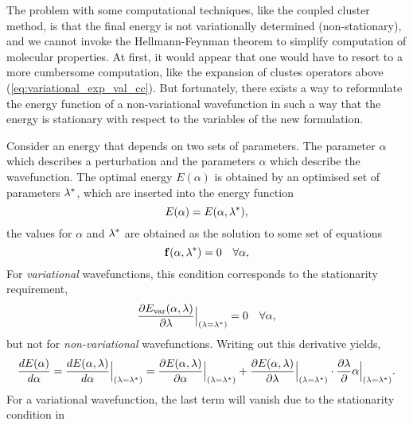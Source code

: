 The problem with some computational techniques, like the coupled cluster method,
is that the final energy is not variationally determined (non-stationary), 
and we cannot invoke the Hellmann-Feynman theorem to simplify computation of 
molecular properties. At first, it would appear that one would have to resort to 
a more cumbersome computation, like the expansion of clustes operators above 
(\autoref{eq:variational_exp_val_cc}). But fortunately, there exists a way to 
reformulate the energy function of a non-variational wavefunction in such a way that 
the energy is stationary with respect to the variables of the new formulation.

Consider an energy that depends on two sets of parameters. The parameter $\alpha$ which 
describes a perturbation and the parameters $\alpha$ which describe the wavefunction. 
The optimal energy $E(\alpha)$ is obtained by an optimised set of parameters $\vb{\lambda}^*$,
which are inserted into the energy function
\begin{equation}
    E(\alpha) = E(\alpha, \vb{\lambda}^*),
\end{equation}
the values for $\alpha$ and $\vb{\lambda}^*$ are obtained as the solution to some set of 
equations
\begin{equation}
    \label{eq:nonvar_cond_HellF}
    \vb{f}(\alpha, \vb{\lambda}^*) = 0 \quad \forall \alpha,
\end{equation}
For \emph{variational} wavefunctions, this condition corresponds to the stationarity requirement,
\begin{equation}
    \label{eq:stat_cond_HellF}
    \frac{\partial E_{\text{var}}(\alpha, \vb{\lambda})}
    {\partial \lambda}\Big\lvert_{(\vb{\lambda} = \vb{\lambda}^*)}
    = 0 \quad \forall \alpha,
\end{equation}
but not for \emph{non-variational} wavefunctions. Writing out this derivative yields,
\begin{equation}
\label{eq:total_derivative_HellF_energy}
\frac{dE(\alpha)}{d\alpha} 
= \frac{dE(\alpha, \vb{\lambda})}{d\alpha}\Big\lvert_{(\vb{\lambda} = \vb{\lambda}^*)}
= \frac{\partial E(\alpha, \vb{\lambda})}{\partial\alpha}\Big\lvert_{(\vb{\lambda} = \vb{\lambda}^*)}
+ \frac{\partial E(\alpha, \vb{\lambda})}{\partial\vb{\lambda}}\Big\lvert_{(\vb{\lambda} = \vb{\lambda}^*)}
\cdot
\frac{\partial \vb{\lambda}}{\partial}\alpha\Big\lvert_{(\vb{\lambda} = \vb{\lambda}^*)}.
\end{equation}
For a variational wavefunction, the last term will vanish due to the stationarity condition in 
